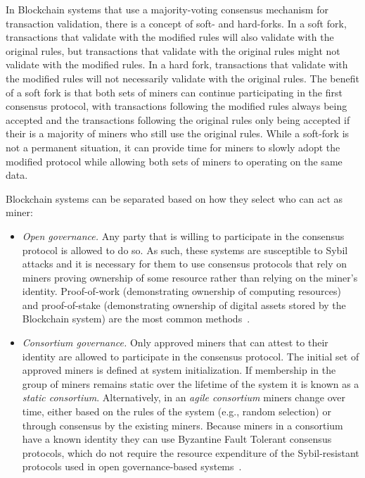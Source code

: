 In Blockchain systems that use a majority-voting consensus mechanism for transaction validation, there is a concept of soft- and hard-forks.
In a soft fork, transactions that validate with the modified rules will also validate with the original rules, but transactions that validate with the original rules might not validate with the modified rules.
In a hard fork, transactions that validate with the modified rules will not necessarily validate with the original rules.
The benefit of a soft fork is that both sets of miners can continue participating in the first consensus protocol, with transactions following the modified rules always being accepted and the transactions following the original rules only being accepted if their is a majority of miners who still use the original rules.
While a soft-fork is not a permanent situation, it can provide time for miners to slowly adopt the modified protocol while allowing both sets of miners to operating on the same data.

Blockchain systems can be separated based on how they select who can act as miner:

\begin{itemize}
	\item \emph{Open governance.}
	Any party that is willing to participate in the consensus protocol is allowed to do so.
	As such, these systems are susceptible to Sybil attacks and it is necessary for them to use consensus protocols that rely on miners  proving ownership of some resource rather than relying on the miner's identity.
	Proof-of-work (demonstrating ownership of computing resources) and proof-of-stake (demonstrating ownership of digital assets stored by the Blockchain system) are the most common methods~\cite{Bano17,garay2018consensus}.
	
	\item \emph{Consortium governance.}
	Only approved miners that can attest to their identity are allowed to participate in the consensus protocol.
	The initial set of approved miners is defined at system initialization.
	If membership in the group of miners remains static over the lifetime of the system it is known as a \emph{static consortium}.
	Alternatively, in an \emph{agile consortium} miners change over time, either based on the rules of the system (e.g., random selection) or through consensus by the existing miners.
	Because miners in a consortium have a known identity they can use Byzantine Fault Tolerant consensus protocols, which do not require the resource expenditure of the Sybil-resistant protocols used in open governance-based systems~\cite{Bano17,garay2018consensus}.		
\end{itemize}

